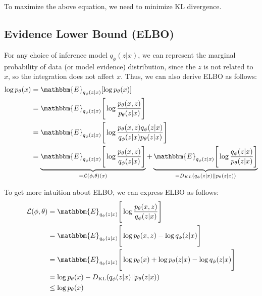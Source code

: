 To maximize the above equation, we need to minimize KL divergence. 




\subsection{Evidence Lower Bound (ELBO)}
For any choice of inference model $q_{\phi}(z|x)$, we can represent the marginal probability of data (or model evidence) distribution, since the $z$ is not related to $x$, so the integration does not affect $x$. Thus, we can also derive ELBO as follows:
\begin{align*}
	\log p_{\theta}(x) &= \mathbbm{E}_{q_{\phi}(z|x)}[\log p_{\theta}(x)]\\
	& = \mathbbm{E}_{q_{\phi}(z|x)}\Bigg[\log \frac{p_{\theta}(x,z)}{p_{\theta}(z|x)}\Bigg]\\
	& = \mathbbm{E}_{q_{\phi}(z|x)}\Bigg[\log \frac{p_{\theta}(x,z)q_{\phi}(z|x)}{q_{\phi}(z|x) p_{\theta}(z|x)}\Bigg]\\
	& = \underbrace{\mathbbm{E}_{q_{\phi}(z|x)}\Bigg[\log \frac{p_{\theta}(x,z)}{q_{\phi}(z|x) }\Bigg]}_{=\mathcal{L}(\phi,\theta)(x)}+\underbrace{ \mathbbm{E}_{q_{\phi}(z|x)}\Bigg[\log \frac{q_{\phi}(z|x)}{p_{\theta}(z|x)}\Bigg]}_{=D_{KL}(q_{\phi}(z|x)||p_{\theta}(z|x))}
\end{align*}

To get more intuition about ELBO, we can express ELBO as follows:
\begin{align*}
	\mathcal{L}(\phi,\theta) & = \mathbbm{E}_{q_{\phi}(z|x)}\Bigg[\log \frac{p_{\theta}(x,z)}{q_{\phi}(z|x) }\Bigg]\\
	& = \mathbbm{E}_{q_{\phi}(z|x)}\Bigg[\log p_{\theta}(x,z)-\log q_{\phi}(z|x)\Bigg]\\
	& = \mathbbm{E}_{q_{\phi}(z|x)}\Bigg[\log p_{\theta}(x)+\log p_{\theta}(z|x)-\log q_{\phi}(z|x)\Bigg]\\
	& = \log p_{\theta}(x) - D_{\textrm{KL}}(q_{\phi}(z|x)||p_{\theta}(z|x))\\
	& \leq \log p_{\theta}(x)
\end{align*}


